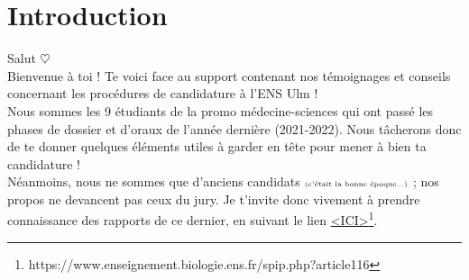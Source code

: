 \section{Introduction}

Salut $\heartsuit$\\

Bienvenue à toi ! Te voici face au support contenant nos témoignages et conseils concernant les procédures de candidature à l'ENS Ulm !\\

Nous sommes les 9 étudiants de la promo médecine-sciences qui ont passé les phases de dossier et d'oraux de l'année dernière (2021-2022). Nous tâcherons donc de te donner quelques éléments utiles à garder en tête pour mener à bien ta candidature !\\

Néanmoins, nous ne sommes que d'anciens candidats $\tiny\text{(c'était la bonne époque...)}$ ; nos propos ne devancent pas ceux du jury. Je t'invite donc vivement à prendre connaissance des rapports de ce dernier, en suivant le lien \href{https://www.enseignement.biologie.ens.fr/spip.php?article116}{<ICI>}\footnote{https://www.enseignement.biologie.ens.fr/spip.php?article116}.